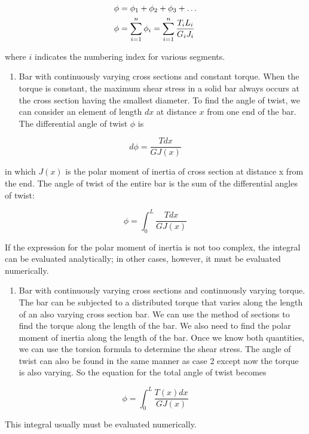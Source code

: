 \documentclass[a4paper,openany,12pt]{book}
\begin{document}
$$\begin{gathered}
         \phi  = \phi_1 + \phi_2 + \phi_3 +  \ldots  \hfill \\
         \phi  = \sum\limits_{i = 1}^n \phi_i = \sum\limits_{i = 1}^n \dfrac{T_iL_i}{G_iJ_i}  \hfill \\ 
       \end{gathered}$$

where \(i\) indicates the numbering index for various segments.

\begin{enumerate}
\item Bar with continuously varying cross sections and constant torque.
When the torque is constant, the maximum shear stress in a solid bar
always occurs at the cross section having the smallest diameter. To
find the angle of twist, we can consider an element of length \(dx\) at
distance \(x\) from one end of the bar. The differential angle of twist
\(\phi\) is
\end{enumerate}


$$d\phi  = \frac{Tdx}{GJ(x)}$$

in which \(J(x)\) is the polar moment of inertia of cross section at
distance x from the end. The angle of twist of the entire bar is the
sum of the differential angles of twist:

$$\phi  = \int_0^L \frac{Tdx}{GJ(x)}$$

If the expression for the polar moment of inertia is not too complex,
the integral can be evaluated analytically; in other cases, however,
it must be evaluated numerically.

\begin{enumerate}
\item Bar with continuously varying cross sections and continuously varying
torque. The bar can be subjected to a distributed torque that varies
along the length of an also varying cross section bar. We can use the
method of sections to find the torque along the length of the bar. We
also need to find the polar moment of inertia along the length of the
bar. Once we know both quantities, we can use the torsion formula to
determine the shear stress. The angle of twist can also be found in
the same manner as case 2 except now the torque is also varying. So
the equation for the total angle of twist becomes
\end{enumerate}


$$\phi  = \int_0^L \frac{T(x)dx}{GJ(x)}$$

This integral usually must be evaluated numerically.
\end{document}
